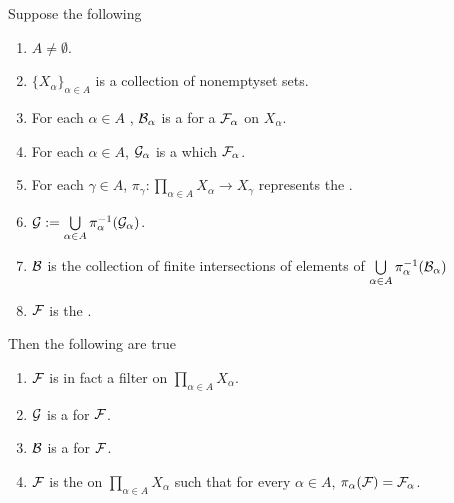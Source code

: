 \begin{prop}
    \label{prop:ProductFilterFacts}
    Suppose the following
\begin{enumerate}
    \item $A \neq \emptyset$.
    \item $\{X_\alpha\}_{\alpha \in A}$ is a collection of nonemptyset sets. 
    \item For each $\alpha \in A$
    , $\mathcal{B}_\alpha$ is a \FilterBase for a \Filter $\mathcal{F}_\alpha$ on $X_\alpha$.
    \item For each $\alpha \in A$, $\mathcal{G}_\alpha$ is a \FilterSubbasis
    which \FilterGenerates $\mathcal{F}_\alpha$. 
    \item For each $\gamma \in A$, $\pi_\gamma : \prod\limits_{\alpha \in A} X_\alpha \to  X_\gamma$ represents the \ProjectionMap. 
    \item $\mathcal{G}:=\bigcup\limits_{\alpha \in A} \pi_\alpha^{-1}(\mathcal{G}_\alpha)$. 
    \item $\mathcal{B}$ is the collection of finite intersections of elements of 
        $\bigcup\limits_{\alpha \in A} \pi_{\alpha}^{-1}(\mathcal{B}_\alpha)$
    \item $\mathcal{F}$ is the \ProductFilter. 
\end{enumerate}
Then the following are true 
\begin{enumerate}
\item  $\mathcal{F}$ is in fact a filter on $\prod\limits_{\alpha\in A} X_\alpha$. 
\item $\mathcal{G}$ is a \FilterSubbasis for $\mathcal{F}$. 
\item $\mathcal{B}$ is a \FilterBase for $\mathcal{F}$. 
\item $\mathcal{F}$ is the \CoarsestFilter \Filter on $\prod\limits_{\alpha \in A} X_\alpha$ such that 
for every $\alpha \in A$, $\pi_\alpha (\mathcal{F}) = \mathcal{F}_\alpha$. 
\end{enumerate}
\end{prop}
